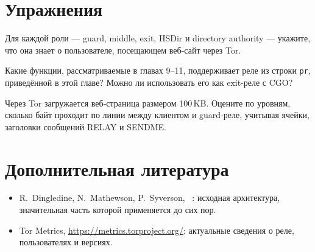 \section*{Упражнения}

\begin{esercizio}[1]\label{es:06-vista}
Для каждой роли --- guard, middle, exit, HSDir и directory authority --- укажите, что она знает о пользователе, посещающем веб-сайт через Tor.
\end{esercizio}

\begin{esercizio}[1]\label{es:06-pr}
Какие функции, рассматриваемые в главах 9--11, поддерживает реле из строки \texttt{pr}, приведённой в этой главе? Можно ли использовать его как exit-реле с CGO?
\end{esercizio}

\begin{esercizio}[2]\label{es:06-livelli}
Через Tor загружается веб-страница размером 100\,KB. Оцените по уровням, сколько байт проходит по линии между клиентом и guard-реле, учитывая ячейки, заголовки сообщений RELAY и SENDME.
\end{esercizio}

\section*{Дополнительная литература}
\begin{itemize}
  \item R.~Dingledine, N.~Mathewson, P.~Syverson, ~\cite{dingledine2004tor}: исходная архитектура, значительная часть которой применяется до сих пор.
  \item Tor Metrics, \url{https://metrics.torproject.org/}: актуальные сведения о реле, пользователях и версиях.
\end{itemize}
